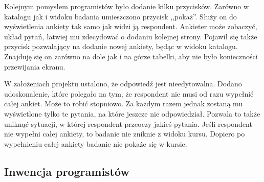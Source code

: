 \documentclass[12pt]{article}
\begin{document}
Kolejnym pomysłem programistów było dodanie kilku przycisków. Zarówno w katalogu jak i widoku badania umieszczono przycisk ,,pokaż''. Służy on do wyświetlenia ankiety tak samo jak widzi ją respondent. Ankieter może zobaczyć, układ pytań, łatwiej mu zdecydować o dodaniu kolejnej strony. Pojawił się także przycisk pozwalający na dodanie nowej ankiety, będąc w widoku katalogu. Znajduję się on zarówno na dole jak i na górze tabelki, aby nie było konieczności przewijania ekranu.

W założeniach projektu ustalono, że odpowiedź jest nieedytowalna. Dodano udoskonalenie, które polegało na tym, że respondent nie musi od razu wypełnić całej ankiet. Może to robić stopniowo. Za każdym razem jednak zostaną mu wyświetlone tylko te pytania, na które jeszcze nie odpowiedział. Pozwala to także uniknąć sytuacji, w której respondent przeoczy jakieś pytania. Jeśli respondent nie wypełni całej ankiety, to badanie nie zniknie z widoku kursu. Dopiero po wypełnieniu całej ankiety badanie nie pokaże się w kursie.

\subsection{Inwencja programistów}
\end{document}
